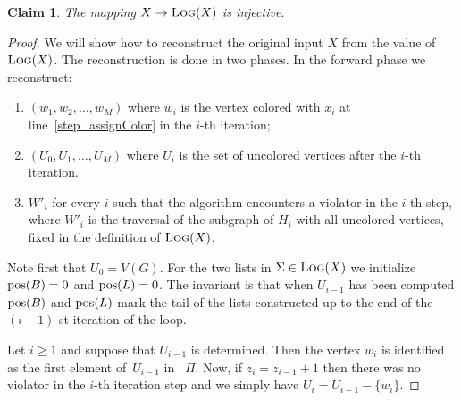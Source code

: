 \documentclass[11pt]{article}
\newtheorem*{klaim}{Claim}
\begin{document}
\begin{klaim}
The mapping $X \to \text{\scshape Log}(X)$ is injective.
\end{klaim}

\begin{proof}
  We will show how to reconstruct the original input $X$
  from the value of $\text{\scshape Log}(X)$.
  The reconstruction is done in two
  phases. In the forward phase we reconstruct:
  \begin{enumerate}[label=\textup{(\roman*)},nosep]
  \item $(w_1,w_2,\ldots,w_M)$ where $w_i$ is the vertex colored with $x_i$
  at line~\ref{step_assignColor} in the $i$-th iteration;
  \item $(U_0,U_1,\ldots,U_M)$ where $U_i$ is the set of uncolored vertices 
  after the $i$-th iteration.
  \item $W'_i$ for every $i$ such that the algorithm encounters a violator in the $i$-th step, 
  where $W'_i$ is the traversal of the subgraph of $H_i$ with all uncolored vertices, 
  fixed in the definition of $\text{\scshape Log}(X)$.
  \end{enumerate} 
  Note first that $U_0=V(G)$.
  For the two lists in
  $\Sigma \in \text{\scshape Log}(X)$ we initialize $\text{\rmfamily pos}(B)=0$ and $\text{\rmfamily pos}(L)=0$.
  The invariant is that when $U_{i-1}$ has been computed $\text{\rmfamily pos}(B)$ and
  $\text{\rmfamily pos}(L)$ mark the tail of the lists constructed up to the end of 
  the $(i-1)$-st iteration of the loop.

  Let $i\geq1$ and suppose that $U_{i-1}$ is determined.
  Then the vertex $w_i$ is identified as the 
  first element of~$U_{i-1}$ in ~$\Pi$.
  Now, if $z_{i} = z_{i-1} +1$ then 
  there was no violator in the $i$-th iteration step and we simply have 
  $U_i = U_{i-1} - \{w_i\}$.
  

\end{proof}
\end{document}
